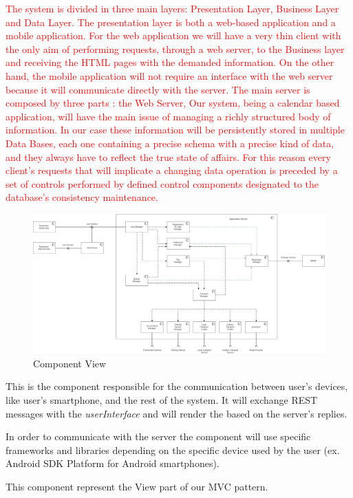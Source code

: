\textcolor{red}{The system is divided in three main layers: Presentation Layer, Business Layer and Data Layer.
The presentation layer is both a web-based application and a mobile application. For the web application we will have a very thin client with the only aim of performing requests, through a web server, to the Business layer and receiving the HTML pages with the demanded information.
On the other hand, the mobile application will not require an interface with the web server because it will communicate directly with the server.
The main server is composed by three parts : the Web Server, 
Our system, being a calendar based application, will have the main issue of managing a richly structured body of information. In our case these information will be persistently stored in multiple Data Bases, each one containing a precise schema with a precise kind of data, and they always have to reflect the true state of affairs. For this reason every client's requests that will implicate a changing data operation is preceded by a set of controls performed by defined control components designated to the database’s consistency maintenance.}

\begin{figure}[H]
	\centering
	\includegraphics[scale=0.17]{Images/Architecture/Components_View}
	\caption{Component View}
\end{figure}
This is the component responsible for the communication between user’s devices, like user’s smartphone, and the rest of the system. It will exchange REST messages with the \emph{userInterface} and will render the  based on the server’s replies.\par
In order to communicate with the server the component will use specific frameworks and libraries depending on the specific device used by the user (ex. Android SDK Platform for Android smartphones).\par
This component represent the View part of our MVC pattern.

